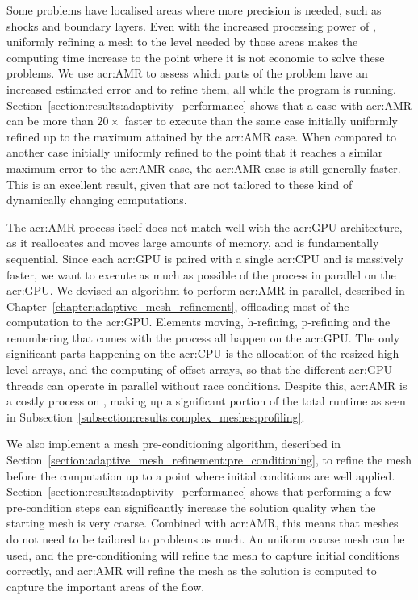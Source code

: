 Some problems have localised areas where more precision is needed, such as shocks and boundary
layers. Even with the increased processing power of , uniformly refining a mesh
to the level needed by those areas makes the computing time increase to the point where it is not
economic to solve these problems. We use \acrlong{acr:AMR} to assess which parts of the problem have
an increased estimated error and to refine them, all while the program is running.
Section~\ref{section:results:adaptivity_performance} shows that a case with \acrshort{acr:AMR} can
be more than \(20 \times \) faster to execute than the same case initially uniformly refined up to
the maximum attained by the \acrshort{acr:AMR} case. When compared to another case initially
uniformly refined to the point that it reaches a similar maximum error to the \acrshort{acr:AMR}
case, the \acrshort{acr:AMR} case is still generally faster. This is an excellent result, given that
 are not tailored to these kind of dynamically changing computations. 

The \acrshort{acr:AMR} process itself does not match well with the \acrshort{acr:GPU} architecture,
as it reallocates and moves large amounts of memory, and is fundamentally sequential. Since each
\acrshort{acr:GPU} is paired with a single \acrshort{acr:CPU} and is massively faster, we want to
execute as much as possible of the process in parallel on the \acrshort{acr:GPU}. We devised an
algorithm to perform \acrshort{acr:AMR} in parallel, described in
Chapter~\ref{chapter:adaptive_mesh_refinement}, offloading most of the computation to the
\acrshort{acr:GPU}. Elements moving, h-refining, p-refining and the renumbering that comes with the
process all happen on the \acrshort{acr:GPU}. The only significant parts happening on the
\acrshort{acr:CPU} is the allocation of the resized high-level arrays, and the computing of offset
arrays, so that the different \acrshort{acr:GPU} threads can operate in parallel without race
conditions. Despite this, \acrshort{acr:AMR} is a costly process on , making up
a significant portion of the total runtime as seen in
Subsection~\ref{subsection:results:complex_meshes:profiling}.

We also implement a mesh pre-conditioning algorithm, described in
Section~\ref{section:adaptive_mesh_refinement:pre_conditioning}, to refine the mesh before the
computation up to a point where initial conditions are well applied.
Section~\ref{section:results:adaptivity_performance} shows that performing a few pre-condition steps
can significantly increase the solution quality when the starting mesh is very coarse. Combined with
\acrshort{acr:AMR}, this means that meshes do not need to be tailored to problems as much. An
uniform coarse mesh can be used, and the pre-conditioning will refine the mesh to capture initial
conditions correctly, and \acrshort{acr:AMR} will refine the mesh as the solution is computed to
capture the important areas of the flow.

